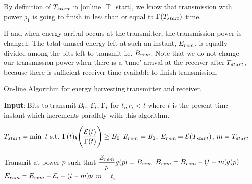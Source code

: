 By definition of $T_{\mbox{\scriptsize{start}}}$ in \eqref{online_T_start}, we know that transmission with power $p_1$ is going to finish in less than or equal to  $\TRx(T_{\mbox{\scriptsize{start}}})$ time.

If and when energy arrival occurs at the transmitter, the transmission power is changed. The total unused energy left at such an instant, $E_{\mbox{\scriptsize{rem}}}$, is equally divided among the bits left to transmit i.e. $B_{\mbox{\scriptsize{rem}}}$. Note that we do not change our transmission power when there is a `time' arrival at the receiver after $T_{\mbox{\scriptsize{start}}}$, because there is sufficient receiver time available to finish transmission.
\begin{algorithm}
\caption {On-line Algorithm for energy harvesting transmitter and receiver.}
\footnotesize
\label{algo_online}
\begin{algorithmic}[1]
\State \textbf{Input}: Bits to transmit $B_0$; $\mathcal{E}_i$, $\Gamma_i$ for $t_i,r_i<t$ where $t$ is the present time instant which increments parallely with this algorithm. 

\State $T_{\mbox{\scriptsize{start}}}=\min\ t$ s.t. $\Gamma(t)g\Bigg{(} \dfrac{\mathcal{E}(t)}{\Gamma(t)}\Bigg{)}\ge B_0$
\State $B_{\mbox{\scriptsize{rem}}}=B_0$, $E_{\mbox{\scriptsize{rem}}}=\ETx(T_{\mbox{\scriptsize{start}}})$, $m=T_{\mbox{\scriptsize{start}}}$

\Do
	\State Transmit at power $p$ such that $\dfrac{E_{\mbox{\scriptsize{rem}}}}{p} g(p)= B_{\mbox{\scriptsize{rem}}}$
		\State $B_{\mbox{\scriptsize{rem}}}=B_{\mbox{\scriptsize{rem}}}-(t-m)g(p)$
		\State $E_{\mbox{\scriptsize{rem}}}=E_{\mbox{\scriptsize{rem}}}+\ETx_i-(t-m)p$
		\State $m=t_i$
	\EndIf
{}
\end{algorithmic}
\end{algorithm}

